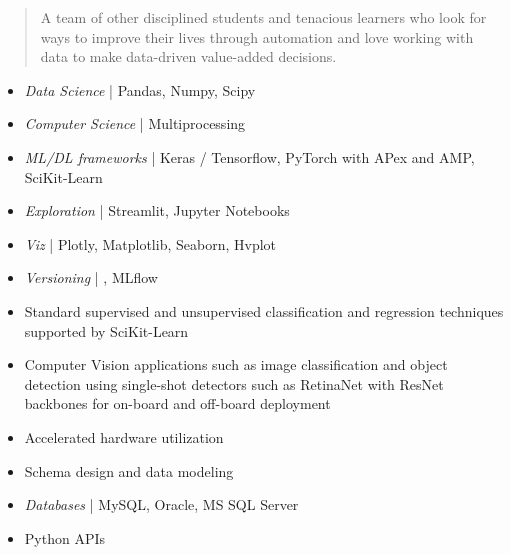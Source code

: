 \begin{quote}
\justify
A team of other disciplined students and tenacious learners who look for ways to improve their lives through automation and love working with data to make data-driven value-added decisions.
\end{quote}


\begin{itemize}
\item \textit{Data Science} | Pandas, Numpy, Scipy
\item \textit{Computer Science} | Multiprocessing
\item \textit{ML/DL frameworks} | Keras / Tensorflow, PyTorch with APex and AMP, SciKit-Learn
\item \textit{Exploration} | Streamlit, Jupyter Notebooks
\item \textit{Viz} | Plotly, Matplotlib, Seaborn, Hvplot
\item \textit{Versioning} | {\faGit}, MLflow

\end{itemize}

\begin{itemize}
\item Standard supervised and unsupervised classification and regression techniques supported by SciKit-Learn
\item Computer Vision applications such as image classification and object detection using single-shot detectors such as RetinaNet with ResNet backbones for on-board and off-board deployment
\item Accelerated hardware utilization

\end{itemize}

\begin{itemize}
\item Schema design and data modeling
\item \textit{Databases} | MySQL, Oracle, MS SQL Server
\item Python APIs

\end{itemize}


